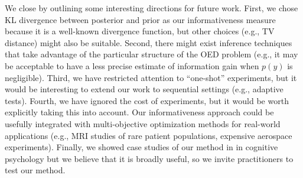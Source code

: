 \documentclass{article}
\begin{document}
We close by outlining some interesting directions for future work.
First, we chose KL divergence between posterior and prior as our informativeness measure because it is a well-known divergence function, but other choices (e.g., TV distance) might also be suitable.
Second, there might exist inference techniques that take advantage of the particular structure of the OED problem (e.g., it may be acceptable to have a less precise estimate of information gain when $p(y)$ is negligible).
Third, we have restricted attention to ``one-shot'' experiments, but it would be interesting to extend our work to sequential settings (e.g., adaptive tests).
Fourth, we have ignored the cost of experiments, but it would be worth explicitly taking this into account.
Our informativeness approach could be usefully integrated with multi-objective optimization methods for real-world applications (e.g., MRI studies of rare patient populations, expensive aerospace experiments).
Finally, we showed case studies of our method in in cognitive psychology but we believe that it is broadly useful, so we invite practitioners to test our method.



\end{document}
